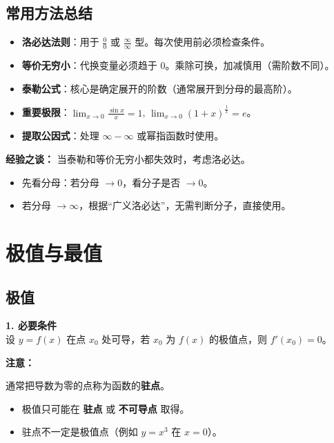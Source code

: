 \documentclass[a4paper,12pt]{ctexart}
\newenvironment{purplebox}
  {\begin{tcolorbox}[colback=white, colframe=boxpurple, boxrule=1pt, sharp corners, title=\textbf{定义/定理/核心公式}]}
  {\end{tcolorbox}}
\newcommand{\zh}[1]{\par\smallskip\noindent\textbf{#1}\par\smallskip}
\begin{document}
\subsection{常用方法总结}
\begin{itemize}
    \item \textbf{洛必达法则}：用于 $\frac{0}{0}$ 或 $\frac{\infty}{\infty}$ 型。每次使用前必须检查条件。
    \item \textbf{等价无穷小}：代换变量必须趋于 0。乘除可换，加减慎用（需阶数不同）。
    \item \textbf{泰勒公式}：核心是确定展开的阶数（通常展开到分母的最高阶）。
    \item \textbf{重要极限}：$\lim_{x \to 0} \frac{\sin x}{x} = 1$, $\lim_{x \to 0} (1+x)^{\frac{1}{x}} = e$。
    \item \textbf{提取公因式}：处理 $\infty - \infty$ 或幂指函数时使用。
\end{itemize}

\begin{purplebox}
    \textbf{经验之谈：}
    当泰勒和等价无穷小都失效时，考虑洛必达。
    \begin{itemize}
        \item 先看分母：若分母 $\to 0$，看分子是否 $\to 0$。
        \item 若分母 $\to \infty$，根据“广义洛必达”，无需判断分子，直接使用。
    \end{itemize}
\end{purplebox}
\newpage

\section{极值与最值}

\subsection{极值}
\textbf{1. 必要条件} \\
设 $y = f(x)$ 在点 $x_0$ 处可导，若 $x_0$ 为 $f(x)$ 的极值点，则 $f'(x_0) = 0$。

\zh{注意：}
通常把导数为零的点称为函数的\textbf{驻点}。
\begin{itemize}
    \item 极值只可能在 \textbf{驻点} 或 \textbf{不可导点} 取得。
    \item 驻点不一定是极值点（例如 $y=x^3$ 在 $x=0$）。
\end{itemize}
\end{document}
